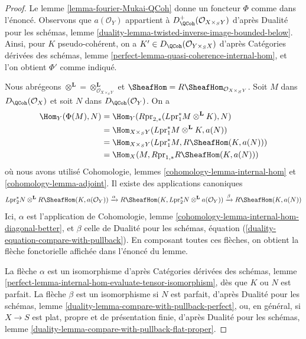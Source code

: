 \begin{proof}
Le lemme \ref{lemma-fourier-Mukai-QCoh} donne un foncteur $\Phi$
comme dans l'énoncé. Observons que $a(\mathcal{O}_Y)$ appartient à
$D^+_\QCoh(\mathcal{O}_{X \times_S Y})$ d'après Dualité pour les schémas,
lemme \ref{duality-lemma-twisted-inverse-image-bounded-below}.
Ainsi, pour $K$ pseudo-cohérent, on a
$K' \in D_\QCoh(\mathcal{O}_{Y \times_S X})$
d'après Catégories dérivées des schémas, lemme
\ref{perfect-lemma-quasi-coherence-internal-hom},
et l'on obtient $\Phi'$ comme indiqué.

\medskip\noindent
Nous abrégeons
$\otimes^\mathbf{L} = \otimes_{\mathcal{O}_{X \times_S Y}}^\mathbf{L}$
et
$\SheafHom = R\SheafHom_{\mathcal{O}_{X \times_S Y}}$.
Soit $M$ dans $D_\QCoh(\mathcal{O}_X)$ et soit
$N$ dans $D_\QCoh(\mathcal{O}_Y)$. On a
\begin{align*}
\Hom_Y(\Phi(M), N)
& =
\Hom_Y(R\text{pr}_{2, *}(L\text{pr}_1^*M \otimes^\mathbf{L} K), N) \\
& =
\Hom_{X \times_S Y}(L\text{pr}_1^*M \otimes^\mathbf{L} K, a(N)) \\
& =
\Hom_{X \times_S Y}(L\text{pr}_1^*M,
R\SheafHom(K, a(N))) \\
& =
\Hom_X(M, R\text{pr}_{1, *}R\SheafHom(K, a(N)))
\end{align*}
où nous avons utilisé Cohomologie, lemmes \ref{cohomology-lemma-internal-hom}
et \ref{cohomology-lemma-adjoint}. Il existe des applications canoniques
$$
L\text{pr}_2^*N \otimes^\mathbf{L} R\SheafHom(K, a(\mathcal{O}_Y))
\xrightarrow{\alpha}
R\SheafHom(K, L\text{pr}_2^*N \otimes^\mathbf{L} a(\mathcal{O}_Y))
\xrightarrow{\beta}
R\SheafHom(K, a(N))
$$
Ici, $\alpha$ est l'application de
Cohomologie, lemme \ref{cohomology-lemma-internal-hom-diagonal-better},
et $\beta$ celle de Dualité pour les schémas, équation
(\ref{duality-equation-compare-with-pullback}).
En composant toutes ces flèches, on obtient la flèche fonctorielle affichée
dans l'énoncé du lemme.

\medskip\noindent
La flèche $\alpha$ est un isomorphisme d'après
Catégories dérivées des schémas, lemme
\ref{perfect-lemma-internal-hom-evaluate-tensor-isomorphism},
dès que $K$ ou $N$ est parfait.
La flèche $\beta$ est un isomorphisme si $N$ est parfait, d'après
Dualité pour les schémas, lemme \ref{duality-lemma-compare-with-pullback-perfect},
ou, en général, si $X \to S$ est
plat, propre et de présentation finie, d'après
Dualité pour les schémas, lemme
\ref{duality-lemma-compare-with-pullback-flat-proper}.
\end{proof}


